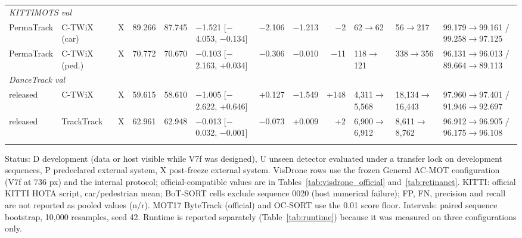 \begin{sidewaystableorg}
\begin{adjustbox}{max width=\linewidth}
\begin{tabular}{lllrrlrrrlll}
\multicolumn{12}{l}{\textit{KITTIMOTS val}} \\
PermaTrack & C-TWiX (car) & X & 89.266 & 87.745 & \ensuremath{-}1.521 [\ensuremath{-}4.053, \ensuremath{-}0.134] & \ensuremath{-}2.106 & \ensuremath{-}1.213 & \ensuremath{-}2 & 62$\to$62 & 56$\to$217 & 99.179$\to$99.161 / 99.258$\to$97.125 \\
PermaTrack & C-TWiX (ped.) & X & 70.772 & 70.670 & \ensuremath{-}0.103 [\ensuremath{-}2.163, +0.034] & \ensuremath{-}0.306 & \ensuremath{-}0.010 & \ensuremath{-}11 & 118$\to$121 & 338$\to$356 & 96.131$\to$96.013 / 89.664$\to$89.113 \\
\multicolumn{12}{l}{\textit{DanceTrack val}} \\
released & C-TWiX & X & 59.615 & 58.610 & \ensuremath{-}1.005 [\ensuremath{-}2.622, +0.646] & +0.127 & \ensuremath{-}1.549 & +148 & 4,311$\to$5,568 & 18,134$\to$16,443 & 97.960$\to$97.401 / 91.946$\to$92.697 \\
released & TrackTrack & X & 62.961 & 62.948 & \ensuremath{-}0.013 [\ensuremath{-}0.032, \ensuremath{-}0.001] & \ensuremath{-}0.073 & +0.009 & +2 & 6,900$\to$6,912 & 8,611$\to$8,762 & 96.912$\to$96.905 / 96.175$\to$96.108 \\
\botrule
\end{tabular}
\end{adjustbox}
\par\smallskip\parbox{\linewidth}{\footnotesize Status: D development (data or host visible while V7f was designed), U unseen detector evaluated under a transfer lock on development sequences, P predeclared external system, X post-freeze external system. VisDrone rows use the frozen General AC-MOT configuration (V7f at 736 px) and the internal protocol; official-compatible values are in Tables~\ref{tab:visdrone_official} and~\ref{tab:retinanet}. KITTI: official KITTI HOTA script, car/pedestrian mean; BoT-SORT cells exclude sequence 0020 (host numerical failure); FP, FN, precision and recall are not reported as pooled values (n/r). MOT17 ByteTrack (official) and OC-SORT use the 0.01 score floor. Intervals: paired sequence bootstrap, 10,000 resamples, seed 42. Runtime is reported separately (Table~\ref{tab:runtime}) because it was measured on three configurations only.}
\end{sidewaystableorg}
